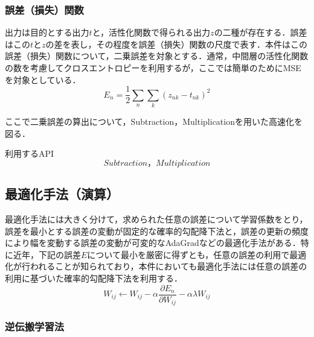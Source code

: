\documentclass{jsarticle}
\begin{document}
\subsubsection{誤差（損失）関数}
\label{誤差（損失）関数}

出力は目的とする出力$t$と，活性化関数で得られる出力$z$の二種が存在する．誤差はこの$t$と$z$の差を表し，その程度を誤差（損失）関数の尺度で表す．本件はこの誤差（損失）関数について，二乗誤差を対象とする．通常，中間層の活性化関数の数を考慮してクロスエントロピーを利用するが，ここでは簡単のためにMSEを対象としている．
\[
E_n=\frac{1}{2} \sum_n \sum_k (z_{nk} - t_{nk})^2
\]

ここで二乗誤差の算出について，Subtraction，Multiplicationを用いた高速化を図る．

\begin{itembox}[l]{利用するAPI}
\[
Subtraction，Multiplication
\]
\end{itembox}

\subsection{最適化手法（演算）}
\label{最適化手法（演算）}

最適化手法には大きく分けて，求められた任意の誤差について学習係数をとり，誤差を最小とする誤差の変動が固定的な確率的勾配降下法と，誤差の更新の頻度により幅を変動する誤差の変動が可変的なAdaGradなどの最適化手法がある．特に近年，下記の誤差$E$について最小を厳密に得ずとも，任意の誤差の利用で最適化が行われることが知られており，本件においても最適化手法には任意の誤差の利用に基づいた確率的勾配降下法を利用する．
\[
W_{ij} \leftarrow W_{ij} - \alpha \frac{\partial E_n}{\partial W_{ij}} - \alpha \lambda W_{ij}
\]

\subsubsection{逆伝搬学習法}
\label{逆伝搬学習法}
\end{document}
